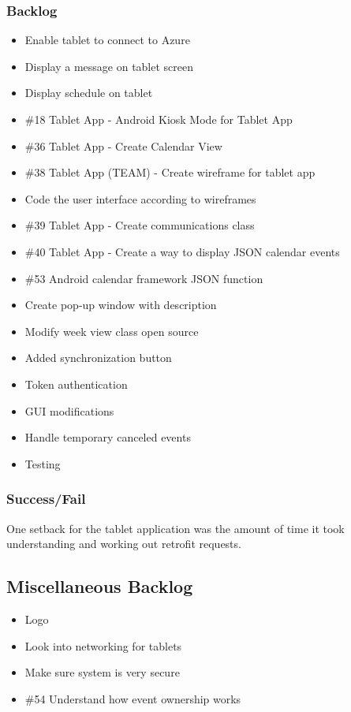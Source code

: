 \subsubsection{Backlog}
\begin{itemize}
\item Enable tablet to connect to Azure
\item Display a message on tablet screen
\item Display schedule on tablet	
\item \#18 Tablet App - Android Kiosk Mode for Tablet App
\item \#36 Tablet App - Create Calendar View
\item \#38 Tablet App (TEAM) - Create wireframe for tablet app
\item Code the user interface according to wireframes
\item \#39 Tablet App - Create communications class
\item \#40 Tablet App - Create a way to display JSON calendar events
\item \#53 Android calendar framework JSON function
\item Create pop-up window with description
\item Modify week view class open source
\item Added synchronization button
\item Token authentication
\item GUI modifications
\item Handle temporary canceled events
\item Testing
\end{itemize}

\subsubsection{Success/Fail}
One setback for the tablet application was the amount of time it took understanding and working out retrofit requests.

\subsection*{Miscellaneous Backlog}
\begin{itemize}
\item Logo
\item Look into networking for tablets
\item Make sure system is very secure
\item \#54 Understand how event ownership works
\end{itemize} 

